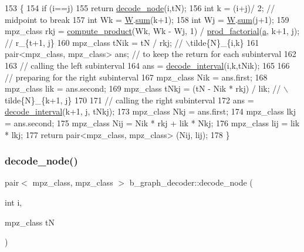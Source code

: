 \begin{DoxyCode}
153 \{
154   \textcolor{keywordflow}{if} (i==j)
155     \textcolor{keywordflow}{return} \hyperlink{classb__graph__decoder_a3d6d38da4436a92ebd01693cd3eb7c16}{decode\_node}(i,tN);
156   \textcolor{keywordtype}{int} k = (i+j)/ 2; \textcolor{comment}{// midpoint to break}
157   \textcolor{keywordtype}{int} Wk = \hyperlink{classb__graph__decoder_a2c3f91db1f54ddfd411f74d18b01b606}{W}.\hyperlink{classreverse__fenwick__tree_a672731fd6395b4853430073a099a80e6}{sum}(k+1);
158   \textcolor{keywordtype}{int} Wj = \hyperlink{classb__graph__decoder_a2c3f91db1f54ddfd411f74d18b01b606}{W}.\hyperlink{classreverse__fenwick__tree_a672731fd6395b4853430073a099a80e6}{sum}(j+1);
159   mpz\_class rkj = \hyperlink{compression__helper_8cpp_ae2afb43aabe50f7d42aae8f82b5a35f4}{compute\_product}(Wk, Wk - Wj, 1) / 
      \hyperlink{compression__helper_8cpp_a86d8a20e022dc06b23df3b08ac10b7d1}{prod\_factorial}(\hyperlink{classb__graph__decoder_afcf783e4199fb8f9d6828db08bb12333}{a}, k+1, j); \textcolor{comment}{// r\_\{t+1, j\}}
160   mpz\_class tNik = tN / rkj; \textcolor{comment}{// \(\backslash\)tilde\{N\}\_\{i,k\}}
161   pair<mpz\_class, mpz\_class> ans; \textcolor{comment}{// to keep the return for each subinterval}
162 
163   \textcolor{comment}{// calling the left subinterval }
164   ans = \hyperlink{classb__graph__decoder_ae8b20698e015819cbdb8da7997888fd8}{decode\_interval}(i,k,tNik);
165 
166   \textcolor{comment}{// preparing for the right subinterval}
167   mpz\_class Nik = ans.first;
168   mpz\_class lik = ans.second;
169   mpz\_class tNkj = (tN - Nik * rkj) / lik; \textcolor{comment}{// \(\backslash\)tilde\{N\}\_\{k+1, j\}}
170 
171   \textcolor{comment}{// calling the right subinterval}
172   ans = \hyperlink{classb__graph__decoder_ae8b20698e015819cbdb8da7997888fd8}{decode\_interval}(k+1, j, tNkj);
173   mpz\_class Nkj = ans.first;
174   mpz\_class lkj = ans.second;
175   mpz\_class Nij = Nik * rkj + lik * Nkj;
176   mpz\_class lij = lik * lkj;
177   \textcolor{keywordflow}{return} pair<mpz\_class, mpz\_class> (Nij, lij);
178 \}
\end{DoxyCode}
\mbox{\label{classb__graph__decoder_a3d6d38da4436a92ebd01693cd3eb7c16}} 
\subsubsection{\texorpdfstring{decode\+\_\+node()}{decode\_node()}}
{\footnotesize\ttfamily pair$<$ mpz\+\_\+class, mpz\+\_\+class $>$ b\+\_\+graph\+\_\+decoder\+::decode\+\_\+node (\begin{DoxyParamCaption}\item[{int}]{i,  }\item[{mpz\+\_\+class}]{tN }\end{DoxyParamCaption})}



